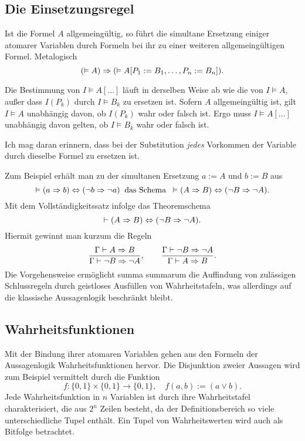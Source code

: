 \subsection{Die Einsetzungsregel}

\begin{Satz}[Einsetzungsregel]\newlinefirst
Ist die Formel $A$ allgemeingültig, so führt die simultane Ersetzung
einiger atomarer Variablen durch Formeln bei ihr zu einer weiteren
allgemeingültigen Formel. Metalogisch
\[(\vDash A)\Rightarrow (\vDash A[P_1:=B_1,\ldots,P_n:=B_n]).\]
\end{Satz}
\begin{Beweis}
Die Bestimmung von $I\models A[\ldots]$ läuft in
derselben Weise ab wie die von $I\models A$, außer dass $I(P_k)$ durch
$I\models B_k$ zu ersetzen ist. Sofern $A$ allgemeingültig ist, gilt
$I\models A$ unabhängig davon, ob $I(P_k)$ wahr oder falsch ist.
Ergo muss $I\models A[\ldots]$ unabhängig davon gelten, ob $I\models B_k$
wahr oder falsch ist.\,\qedsymbol
\end{Beweis}

\noindent
Ich mag daran erinnern, dass bei der Substitution \emph{jedes}
Vorkommen der Variable durch dieselbe Formel zu ersetzen ist.

Zum Beispiel erhält man zu der simultanen Ersetzung
$a:=A$ und $b:=B$ aus
\[\vDash (a\Rightarrow b)\Leftrightarrow (\lnot b\Rightarrow\lnot a)\;\;\text{das Schema}\;\;
\vDash (A\Rightarrow B)\Leftrightarrow (\lnot B\Rightarrow\lnot A).\]
Mit dem Vollständigkeitssatz infolge das Theoremschema
\[\vdash (A\Rightarrow B)\Leftrightarrow (\lnot B\Rightarrow\lnot A).\]
Hiermit gewinnt man kurzum die Regeln
\[\dfrac{\Gamma\vdash A\Rightarrow B}{\Gamma\vdash\lnot B\Rightarrow\lnot A},\qquad
\dfrac{\Gamma\vdash\lnot B\Rightarrow\lnot A}{\Gamma\vdash A\Rightarrow B}.\]
Die Vorgehensweise ermöglicht summa summarum die Auffindung von
zulässigen Schlussregeln durch geistloses Ausfüllen von Wahrheitstafeln,
was allerdings auf die klassische Aussagenlogik beschränkt bleibt.

\subsection{Wahrheitsfunktionen}

Mit der Bindung ihrer atomaren Variablen gehen aus den Formeln der
Aussagenlogik Wahrheitsfunktionen hervor.
Die Disjunktion zweier Aussagen wird zum Beispiel vermittelt durch die Funktion%
\[f\colon\{0,1\}\times\{0,1\}\to\{0,1\},\quad f(a,b):=(a\lor b).\]
Jede Wahrheitsfunktion in $n$ Variablen ist durch ihre Wahrheitstafel
charakterisiert, die aus $2^n$ Zeilen besteht, da der Definitionsbereich
so viele unterschiedliche Tupel enthält. Ein Tupel von Wahrheitswerten
wird auch als Bitfolge betrachtet.

